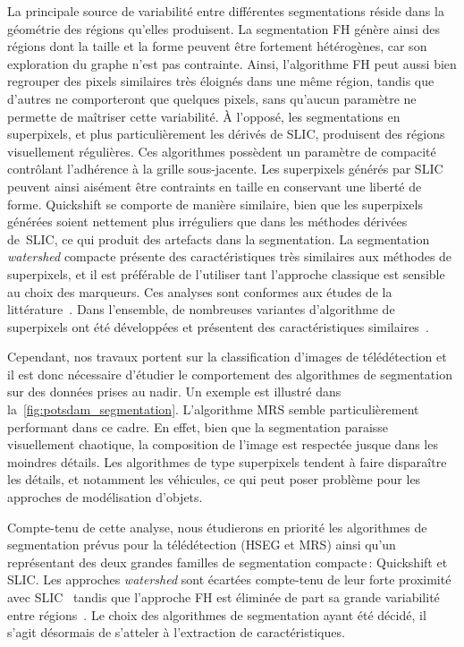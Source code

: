 La principale source de variabilité entre différentes segmentations réside dans la géométrie des régions qu'elles produisent. La segmentation \gls{FH} génère ainsi des régions dont la taille et la forme peuvent être fortement hétérogènes, car son exploration du graphe n'est pas contrainte. Ainsi, l'algorithme \gls{FH} peut aussi bien regrouper des pixels similaires très éloignés dans une même région, tandis que d'autres ne comporteront que quelques pixels, sans qu'aucun paramètre ne permette de maîtriser cette variabilité.
À l'opposé, les segmentations en superpixels, et plus particulièrement les dérivés de \gls{SLIC}, produisent des régions visuellement régulières. Ces algorithmes possèdent un paramètre de compacité contrôlant l'adhérence à la grille sous-jacente. Les superpixels générés par \gls{SLIC} peuvent ainsi aisément être contraints en taille en conservant une liberté de forme. Quickshift se comporte de manière similaire, bien que les superpixels générées soient nettement plus irréguliers que dans les méthodes dérivées de~\gls{SLIC}, ce qui produit des artefacts dans la segmentation. La segmentation \emph{watershed} compacte présente des caractéristiques très similaires aux méthodes de superpixels, et il est préférable de l'utiliser tant l'approche classique est sensible au choix des marqueurs. Ces analyses sont conformes aux études de la littérature~\cite{neubert_superpixel_2012,achanta_slic_2012}. Dans l'ensemble, de nombreuses variantes d'algorithme de superpixels ont été développées et présentent des caractéristiques similaires~\cite{stutz_superpixels_2018}.

Cependant, nos travaux portent sur la classification d'images de télédétection et il est donc nécessaire d'étudier le comportement des algorithmes de segmentation sur des données prises au nadir. Un exemple est illustré dans la~\cref{fig:potsdam_segmentation}. L'algorithme \gls{MRS} semble particulièrement performant dans ce cadre. En effet, bien que la segmentation paraisse visuellement chaotique, la composition de l'image est respectée jusque dans les moindres détails. Les algorithmes de type superpixels tendent à faire disparaître les détails, et notamment les véhicules, ce qui peut poser problème pour les approches de modélisation d'objets.

Compte-tenu de cette analyse, nous étudierons en priorité les algorithmes de segmentation prévus pour la télédétection (\gls{HSEG} et \gls{MRS}) ainsi qu'un représentant des deux grandes familles de segmentation compacte\,: Quickshift et \gls{SLIC}. Les approches \emph{watershed} sont écartées compte-tenu de leur forte proximité avec \gls{SLIC}~\cite{neubert_compact_2014} tandis que l'approche \gls{FH} est éliminée de part sa grande variabilité entre régions~\cite{neubert_superpixel_2012}. Le choix des algorithmes de segmentation ayant été décidé, il s'agit désormais de s'atteler à l'extraction de caractéristiques.

